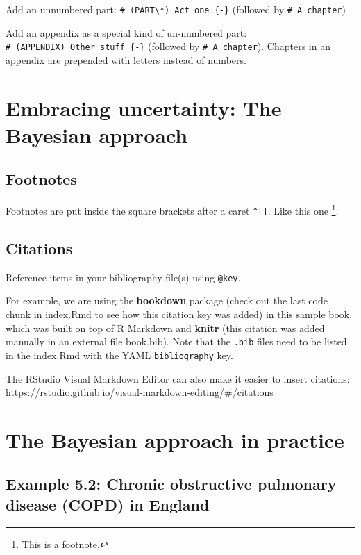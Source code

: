 \documentclass[
]{book}
\begin{document}
Add an unnumbered part: \texttt{\#\ (PART\textbackslash{}*)\ Act\ one\ \{-\}} (followed by \texttt{\#\ A\ chapter})

Add an appendix as a special kind of un-numbered part: \texttt{\#\ (APPENDIX)\ Other\ stuff\ \{-\}} (followed by \texttt{\#\ A\ chapter}). Chapters in an appendix are prepended with letters instead of numbers.

\hypertarget{embracing}{%
\chapter{Embracing uncertainty: The Bayesian approach}\label{embracing}}

\hypertarget{footnotes}{%
\section{Footnotes}\label{footnotes}}

Footnotes are put inside the square brackets after a caret \texttt{\^{}{[}{]}}. Like this one \footnote{This is a footnote.}.

\hypertarget{citations}{%
\section{Citations}\label{citations}}

Reference items in your bibliography file(s) using \texttt{@key}.

For example, we are using the \textbf{bookdown} package \citep{R-bookdown} (check out the last code chunk in index.Rmd to see how this citation key was added) in this sample book, which was built on top of R Markdown and \textbf{knitr} \citep{xie2015} (this citation was added manually in an external file book.bib).
Note that the \texttt{.bib} files need to be listed in the index.Rmd with the YAML \texttt{bibliography} key.

The RStudio Visual Markdown Editor can also make it easier to insert citations: \url{https://rstudio.github.io/visual-markdown-editing/\#/citations}

\hypertarget{Bayesian}{%
\chapter{The Bayesian approach in practice}\label{Bayesian}}

\hypertarget{example-5.2-chronic-obstructive-pulmonary-disease-copd-in-england}{%
\section{Example 5.2: Chronic obstructive pulmonary disease (COPD) in England}\label{example-5.2-chronic-obstructive-pulmonary-disease-copd-in-england}}
\end{document}

